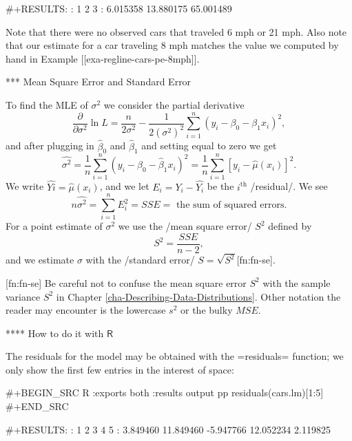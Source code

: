 #+RESULTS:
:         1         2         3 
:  6.015358 13.880175 65.001489

Note that there were no observed cars that traveled 6 mph or 21
mph. Also note that our estimate for a car traveling 8 mph matches the
value we computed by hand in Example [[exa-regline-cars-pe-8mph]].

*** Mean Square Error and Standard Error

To find the MLE of \(\sigma^{2}\) we consider the partial derivative
\begin{equation}
\frac{\partial}{\partial\sigma^{2}}\ln L=\frac{n}{2\sigma^{2}}-\frac{1}{2(\sigma^{2})^{2}}\sum_{i=1}^{n}(y_{i}-\beta_{0}-\beta_{1}x_{i})^{2},
\end{equation}
and after plugging in \(\hat{\beta}_{0}\) and \(\hat{\beta}_{1}\) and
setting equal to zero we get
\begin{equation}
\hat{\sigma^{2}}=\frac{1}{n}\sum_{i=1}^{n}(y_{i}-\hat{\beta}_{0}-\hat{\beta}_{1}x_{i})^{2}=\frac{1}{n}\sum_{i=1}^{n}[y_{i}-\hat{\mu}(x_{i})]^{2}.
\end{equation}
We write \(\hat{Yi}=\hat{\mu}(x_{i})\), and we let
\(E_{i}=Y_{i}-\hat{Y_{i}}\) be the \(i^{\mathrm{th}}\) /residual/. We
see
\begin{equation}
n\hat{\sigma^{2}}=\sum_{i=1}^{n}E_{i}^{2}=SSE=\mbox{ the sum of squared errors.}
\end{equation}
For a point estimate of \(\sigma^{2}\) we use the /mean square error/
\(S^{2}\) defined by
\begin{equation}
S^{2}=\frac{SSE}{n-2},
\end{equation}
and we estimate \(\sigma\) with the /standard error/
\(S=\sqrt{S^{2}}\)[fn:fn-se].

[fn:fn-se] Be careful not to confuse the mean square error \(S^{2}\)
with the sample variance \(S^{2}\) in Chapter
\ref{cha-Describing-Data-Distributions}. Other notation the reader may
encounter is the lowercase \(s^{2}\) or the bulky \(MSE\).

**** How to do it with \(\mathsf{R}\)

The residuals for the model may be obtained with the =residuals=
function; we only show the first few entries in the interest of space:

#+BEGIN_SRC R :exports both :results output pp 
residuals(cars.lm)[1:5]
#+END_SRC

#+RESULTS:
:         1         2         3         4         5 
:  3.849460 11.849460 -5.947766 12.052234  2.119825

